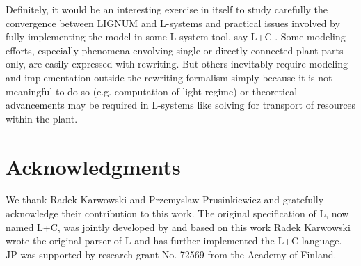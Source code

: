 Definitely, it  would be  an interesting exercise  in itself  to study
carefully the  convergence between LIGNUM and  L-systems and practical
issues involved by fully implementing the model in some L-system tool,
say  L+C  \citep{karwowski:02}.   Some  modeling  efforts,  especially
phenomena envolving single or directly connected plant parts only, are
easily  expressed  with  rewriting.   But  others  inevitably  require
modeling  and implementation  outside the  rewriting  formalism simply
because  it is not  meaningful to  do so  (e.g.  computation  of light
regime) or theoretical advancements  may be required in L-systems like
solving for transport of resources within the plant.

\section{Acknowledgments}

We thank  Radek Karwowski and Przemyslaw  Prusinkiewicz and gratefully
acknowledge   their   contribution  to   this   work.   The   original
specification  of   L,  now  named  L+C,  was   jointly  developed  by
\citet{pp:99a}  and  based  on  this  work Radek  Karwowski  wrote  the
original parser of L and  has further implemented the L+C language. JP
was supported by research grant No. 72569 from the Academy of Finland.
 
